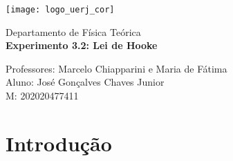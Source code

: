 \documentclass[11pt, article]{abntex2}
\begin{document}
\begin{titlepage}

\parbox{1.5cm}{\texttt{[image: logo\_uerj\_cor]}}
\Large{Departamento de Física Teórica} \\

\vspace{5cm}
\hspace{4.5cm} \Large{\textbf{Experimento 3.2: Lei de Hooke }}
\vspace{11cm}

\begin{flushleft}
Professores: Marcelo Chiapparini e Maria de Fátima\\
Aluno: José Gonçalves Chaves Junior \\
M: 202020477411\\
\end{flushleft}

\end{titlepage}
\newpage
\tableofcontents
\newpage
\section{Introdução}
\end{document}
